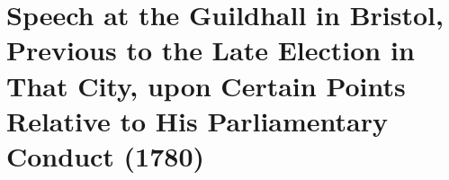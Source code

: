
















\chapter*[Speech at Bristol Previous to the Election]{
Speech at the Guildhall in Bristol, Previous to the Late Election in That City,
upon Certain Points Relative to His Parliamentary Conduct (1780)}

